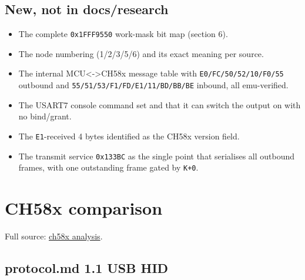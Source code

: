 \subsection{New, not in docs/research}\label{new-not-in-docsresearch}

\begin{itemize}
\tightlist
\item
  The complete \texttt{0x1FFF9550} work-mask bit map (section 6).
\item
  The node numbering (1/2/3/5/6) and its exact meaning per source.
\item
  The internal MCU\textless-\textgreater CH58x message table with
  \texttt{E0/\allowbreak{}FC/\allowbreak{}50/\allowbreak{}52/\allowbreak{}10/\allowbreak{}F0/\allowbreak{}55} outbound and
  \texttt{55/\allowbreak{}51/\allowbreak{}53/\allowbreak{}F1/\allowbreak{}FD/\allowbreak{}E1/\allowbreak{}11/\allowbreak{}BD/\allowbreak{}BB/\allowbreak{}BE} inbound, all emu-verified.
\item
  The USART7 console command set and that it can switch the output on
  with no bind/grant.
\item
  The \texttt{E1}-received 4 bytes identified as the CH58x version
  field.
\item
  The transmit service \texttt{0x133BC} as the single point that
  serialises all outbound frames, with one outstanding frame gated by
  \texttt{K+0}.
\end{itemize}

\section{CH58x comparison}\label{ch58x-comparison}

Full source: \href{notes/ch58x.md}{ch58x analysis}.

\subsection{protocol.md 1.1 USB HID}\label{protocol.md-1.1-usb-hid}

